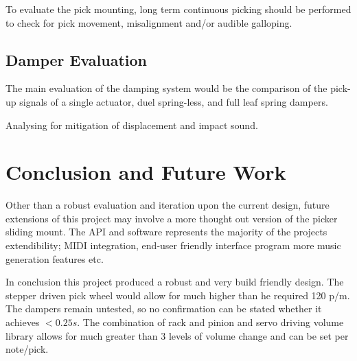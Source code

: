 \documentclass[a4paper,11pt]{article}
\begin{document}
To evaluate the pick mounting, long term continuous picking should be performed to check for pick movement, misalignment and/or audible galloping.  

\subsection{Damper Evaluation}
The main evaluation of the damping system would be the comparison of the pick-up signals of a single actuator, duel spring-less, and full leaf spring dampers.

Analysing for mitigation of displacement and impact sound.

\section{Conclusion and Future Work}

Other than a robust evaluation and iteration upon the current design, future extensions of this project may involve a more thought out version of the picker sliding mount. The API and software represents the majority of the projects extendibility; MIDI integration, end-user friendly interface program more music generation features etc.

In conclusion this project produced a robust and very build friendly design. 
The stepper driven pick wheel would allow for much higher than he required 120 p/m. The dampers remain untested, so no confirmation can be stated whether it achieves $<0.25s$. The combination of rack and pinion and servo driving volume library allows for much greater than 3 levels of volume change and can be set per note/pick.


\newpage


\end{document}
